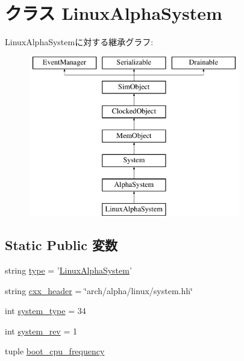 \hypertarget{classAlphaSystem_1_1LinuxAlphaSystem}{
\section{クラス LinuxAlphaSystem}
\label{classAlphaSystem_1_1LinuxAlphaSystem}
}
LinuxAlphaSystemに対する継承グラフ:\begin{figure}[H]
\begin{center}
\leavevmode
\includegraphics[height=7cm]{classAlphaSystem_1_1LinuxAlphaSystem}
\end{center}
\end{figure}
\subsection*{Static Public 変数}
\begin{DoxyCompactItemize}
\item 
string \hyperlink{classAlphaSystem_1_1LinuxAlphaSystem_acce15679d830831b0bbe8ebc2a60b2ca}{type} = '\hyperlink{classAlphaSystem_1_1LinuxAlphaSystem}{LinuxAlphaSystem}'
\item 
string \hyperlink{classAlphaSystem_1_1LinuxAlphaSystem_a17da7064bc5c518791f0c891eff05fda}{cxx\_\-header} = \char`\"{}arch/alpha/linux/system.hh\char`\"{}
\item 
int \hyperlink{classAlphaSystem_1_1LinuxAlphaSystem_acfe3506cfe10e05a2cb2c2973dc5dad2}{system\_\-type} = 34
\item 
int \hyperlink{classAlphaSystem_1_1LinuxAlphaSystem_a261e4081ddd1f0823eccc0f042086c27}{system\_\-rev} = 1
\item 
tuple \hyperlink{classAlphaSystem_1_1LinuxAlphaSystem_aab5259ecbb88c819a4bf9bd03c47b3d9}{boot\_\-cpu\_\-frequency}
\end{DoxyCompactItemize}



